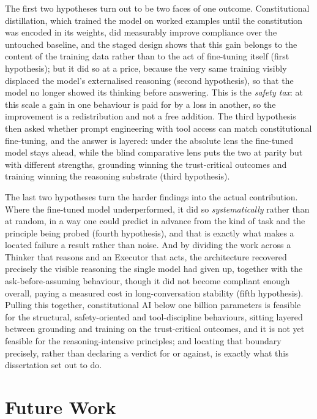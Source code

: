 The first two hypotheses turn out to be two faces of one outcome. Constitutional distillation, which trained the model on worked examples until the constitution was encoded in its weights, did measurably improve compliance over the untouched baseline, and the staged design shows that this gain belongs to the content of the training data rather than to the act of fine-tuning itself (first hypothesis); but it did so at a price, because the very same training visibly displaced the model's externalised reasoning (second hypothesis), so that the model no longer showed its thinking before answering. This is the \emph{safety tax}: at this scale a gain in one behaviour is paid for by a loss in another, so the improvement is a redistribution and not a free addition. The third hypothesis then asked whether prompt engineering with tool access can match constitutional fine-tuning, and the answer is layered: under the absolute lens the fine-tuned model stays ahead, while the blind comparative lens puts the two at parity but with different strengths, grounding winning the trust-critical outcomes and training winning the reasoning substrate (third hypothesis).

The last two hypotheses turn the harder findings into the actual contribution. Where the fine-tuned model underperformed, it did so \emph{systematically} rather than at random, in a way one could predict in advance from the kind of task and the principle being probed (fourth hypothesis), and that is exactly what makes a located failure a result rather than noise. And by dividing the work across a Thinker that reasons and an Executor that acts, the architecture recovered precisely the visible reasoning the single model had given up, together with the ask-before-assuming behaviour, though it did not become compliant enough overall, paying a measured cost in long-conversation stability (fifth hypothesis). Pulling this together, constitutional AI below one billion parameters is feasible for the structural, safety-oriented and tool-discipline behaviours, sitting layered between grounding and training on the trust-critical outcomes, and it is not yet feasible for the reasoning-intensive principles; and locating that boundary precisely, rather than declaring a verdict for or against, is exactly what this dissertation set out to do.

\section{Future Work}
\label{sec:conclusion-future}

